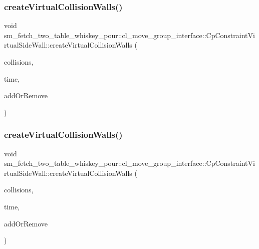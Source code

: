 \subsubsection{\texorpdfstring{create\+Virtual\+Collision\+Walls()}{createVirtualCollisionWalls()}\hspace{0.1cm}{\footnotesize\ttfamily [1/2]}}
{\footnotesize\ttfamily void sm\+\_\+fetch\+\_\+two\+\_\+table\+\_\+whiskey\+\_\+pour\+::cl\+\_\+move\+\_\+group\+\_\+interface\+::\+Cp\+Constraint\+Virtual\+Side\+Wall\+::create\+Virtual\+Collision\+Walls (\begin{DoxyParamCaption}\item[{std\+::vector$<$ moveit\+\_\+msgs\+::\+Collision\+Object $>$ \&}]{collisions,  }\item[{const ros\+::\+Time \&}]{time,  }\item[{int}]{add\+Or\+Remove }\end{DoxyParamCaption})}

\mbox{\label{classsm__fetch__two__table__whiskey__pour_1_1cl__move__group__interface_1_1CpConstraintVirtualSideWall_ad4ecafb1a6c5cc8f72f04643047c0b03}} 
\subsubsection{\texorpdfstring{create\+Virtual\+Collision\+Walls()}{createVirtualCollisionWalls()}\hspace{0.1cm}{\footnotesize\ttfamily [2/2]}}
{\footnotesize\ttfamily void sm\+\_\+fetch\+\_\+two\+\_\+table\+\_\+whiskey\+\_\+pour\+::cl\+\_\+move\+\_\+group\+\_\+interface\+::\+Cp\+Constraint\+Virtual\+Side\+Wall\+::create\+Virtual\+Collision\+Walls (\begin{DoxyParamCaption}\item[{std\+::vector$<$ moveit\+\_\+msgs\+::\+Collision\+Object $>$ \&}]{collisions,  }\item[{const ros\+::\+Time \&}]{time,  }\item[{int}]{add\+Or\+Remove }\end{DoxyParamCaption})}



